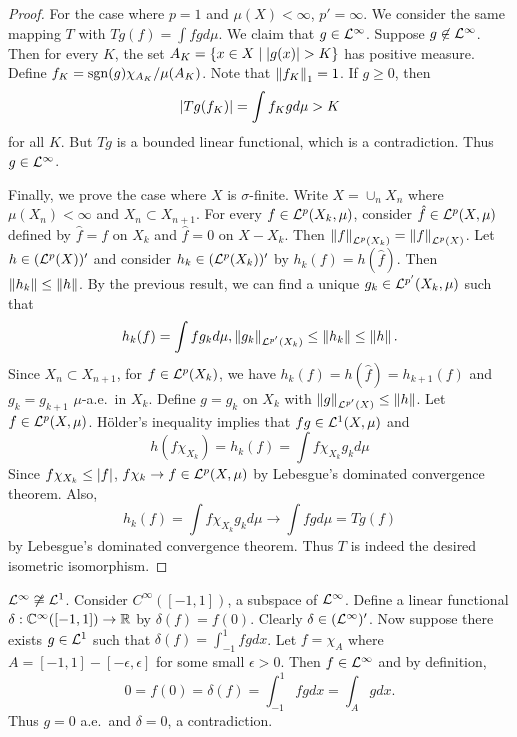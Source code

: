 \begin{proof}
    For the case where $p=1$ and $\mu(X)<\infty$, $p'=\infty$. 
    We consider the same mapping $T$ with $Tg(f) = \int fg d\mu$. 
    We claim that $g\in\mathcal{L}^\infty$. Suppose $g\not\in\mathcal{L}^\infty$. 
    Then for every $K$, the set $A_K = \left\{ x\in X \;\middle\vert\; \left\lvert {g(x)} \right\rvert>K \right\}$ 
    has positive measure. Define $f_K = \operatorname{sgn}(g)\chi_{A_K}/\mu(A_K)$. 
    Note that $\left\lVert {f_K} \right\rVert_1 = 1$. If $g\geq 0$, then 
    \begin{equation*}
        \left\lvert {Tg(f_K)} \right\rvert = \int f_Kgd\mu > K
    \end{equation*}
    for all $K$. But $Tg$ is a bounded linear functional, 
    which is a contradiction. Thus $g\in\mathcal{L}^\infty$. 

    Finally, we prove the case where $X$ is $\sigma$-finite. 
    Write $X = \cup_n X_n$ where $\mu(X_n)<\infty$ and $X_n\subset 
    X_{n+1}$. For every $f\in\mathcal{L}^p(X_k,\mu)$, consider 
    $\hat{f}\in\mathcal{L}^p(X,\mu)$ defined by $\hat{f} = f$ on $X_k$ 
    and $\hat{f} = 0$ on $X-X_k$. Then $\left\lVert {f} \right\rVert_{\mathcal{L}^p(X_k)} 
    = \left\lVert {f} \right\rVert_{\mathcal{L}^p(X)}$. Let $h\in(\mathcal{L}^p(X))'$ and consider 
    $h_k\in (\mathcal{L}^p(X_k))'$ by $h_k(f) = h(\hat{f})$. Then 
    $\left\lVert {h_k} \right\rVert\leq\left\lVert {h} \right\rVert$. By the previous result, we can 
    find a unique $g_k\in\mathcal{L}^{p'}(X_k,\mu)$ such that 
    \begin{equation*}
        h_k(f) = \int f g_k d\mu, \left\lVert {g_k} \right\rVert_{\mathcal{L}^{p'}(X_k)} 
        \leq \left\lVert {h_k} \right\rVert \leq \left\lVert {h} \right\rVert.
    \end{equation*}
    Since $X_n\subset X_{n+1}$, for $f\in\mathcal{L}^p(X_k)$, we have 
    $h_k(f) = h(\hat{f}) = h_{k+1}(f)$ and $g_k = g_{k+1}$ 
    $\mu$-a.e.\ in $X_k$. Define $g = g_k$ on $X_k$ with 
    $\left\lVert {g} \right\rVert_{\mathcal{L}^{p'}(X)}\leq \left\lVert {h} \right\rVert$. Let $f\in\mathcal{L}^p(X,\mu)$. 
    H\"older's inequality implies that $fg\in\mathcal{L}^1(X,\mu)$ and 
    \begin{equation*}
        h(f\chi_{X_k}) = h_k(f) = \int f\chi_{X_k}g_kd\mu
    \end{equation*}
    Since $f\chi_{X_k}\leq \left\lvert {f} \right\rvert$, $f\chi_k\to f\in \mathcal{L}^p(X,\mu)$ 
    by Lebesgue's dominated convergence theorem. Also, 
    \begin{equation*}
        h_k(f) = \int f\chi_{X_k}g_kd\mu \to \int fgd\mu = Tg(f)
    \end{equation*}
    by Lebesgue's dominated convergence theorem. Thus $T$ is 
    indeed the desired isometric isomorphism.
\end{proof}
\begin{remark}
    $\mathcal{L}^\infty\not\cong\mathcal{L}^1$. Consider $C^\infty([-1,1])$, 
    a subspace of $\mathcal{L}^\infty$. Define a linear functional 
    $\delta:\mathbb{C}^\infty([-1,1])\to\mathbb{R}$ by $\delta(f) = f(0)$. 
    Clearly $\delta\in(\mathcal{L}^\infty)'$. Now suppose there exists 
    $g\in\mathcal{L}^1$ such that $\delta(f) = \int_{-1}^{1} fgdx$. 
    Let $f = \chi_A$ where $A = [-1,1]-[-\epsilon,\epsilon]$ 
    for some small $\epsilon>0$. Then $f\in\mathcal{L}^\infty$ and 
    by definition, 
    \begin{equation*}
        0 = f(0) = \delta(f) = \int_{-1}^{1} fgdx = \int_A gdx.
    \end{equation*}
    Thus $g = 0$ a.e.\ and $\delta = 0$, a contradiction.
\end{remark}


